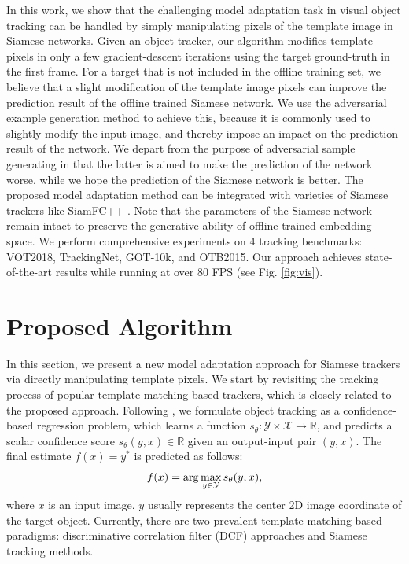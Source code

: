 In this work, we show that the challenging model adaptation task in visual object tracking can be handled by simply manipulating pixels of the template image in Siamese networks. Given an object tracker, our algorithm modifies template pixels in only a few gradient-descent iterations using the target ground-truth in the first frame. For a target that is not included in the offline training set, we believe that a slight modification of the template image pixels can improve the prediction result of the offline trained Siamese network. We use the adversarial example generation method to achieve this, because it is commonly used to slightly modify the input image, and thereby impose an impact on the prediction result of the network. We depart from the purpose of adversarial sample generating in that the latter is aimed to make the prediction of the network worse, while we hope the prediction of the Siamese network is better. The proposed model adaptation method can be integrated with varieties of Siamese trackers like SiamFC++ \cite{SiamFC++}. Note that the parameters of the Siamese network remain intact to preserve the generative ability of offline-trained embedding space. We perform comprehensive experiments on 4 tracking benchmarks: VOT2018\cite{kristan2018sixth}, TrackingNet\cite{muller2018trackingnet}, GOT-10k\cite{huang2018got}, and OTB2015\cite{wu2013online}. Our approach achieves state-of-the-art results while running at over 80 FPS (see Fig. \ref{fig:vis}).

\section{Proposed Algorithm}
In this section, we present a new model adaptation approach for Siamese trackers via directly manipulating template pixels. We start by revisiting the tracking process of popular template matching-based trackers, which is closely related to the proposed approach. Following \cite{Danelljan_2020_CVPR}, we formulate object tracking as a confidence-based regression problem, which learns a function $s_\theta:\mathcal{Y\times X\rightarrow \mathbb R}$, and predicts a scalar confidence score $s_\theta(y,x)\in\mathbb R$ given an output-input pair $(y,x)$. The final estimate $f(x)=y^*$ is predicted as follows:
\vspace{-0.1cm}
\begin{equation}
    f(x) = \arg\max_{y\in \mathcal Y}s_\theta (y,x),
    \vspace{-0.1cm}
\end{equation}
where $x$ is an input image. $y$ usually represents the center 2D image coordinate of the target object. Currently, there are two prevalent template matching-based paradigms: discriminative correlation filter (DCF) approaches and Siamese tracking methods.


